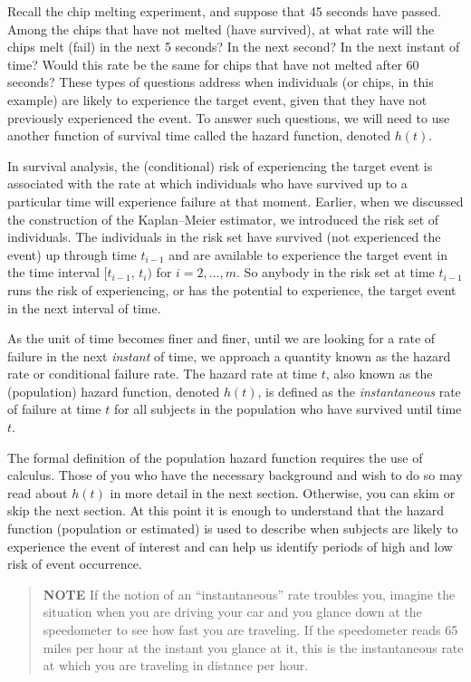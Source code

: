 \documentclass[
]{book}
\begin{document}
Recall the chip melting experiment, and suppose that 45 seconds have passed. Among the chips that have not melted (have survived), at what rate will the chips melt (fail) in the next 5 seconds? In the next second? In the next instant of time? Would this rate be the same for chips that have not melted after 60 seconds? These types of questions address when individuals (or chips, in this example) are likely to experience the target event, given that they have not previously experienced the event. To answer such questions, we will need to use another function of survival time called the hazard function, denoted \(h(t)\).

In survival analysis, the (conditional) risk of experiencing the target event is associated with the rate at which individuals who have survived up to a particular time will experience failure at that moment. Earlier, when we discussed the construction of the Kaplan--Meier estimator, we introduced the risk set of individuals. The individuals in the risk set have survived (not experienced the event) up through time \(t_{i-1}\) and are available to experience the target event in the time interval \([t_{i-1},\,t_i)\) for \(i = 2, \dots, m\). So anybody in the risk set at time \(t_{i-1}\) runs the risk of experiencing, or has the potential to experience, the target event in the next interval of time.

As the unit of time becomes finer and finer, until we are looking for a rate of failure in the next \emph{instant} of time, we approach a quantity known as the hazard rate or conditional failure rate. The hazard rate at time \(t\), also known as the (population) hazard function, denoted \(h(t)\), is defined as the \emph{instantaneous} rate of failure at time \(t\) for all subjects in the population who have survived until time \(t\).

The formal definition of the population hazard function requires the use of calculus. Those of you who have the necessary background and wish to do so may read about \(h(t)\) in more detail in the next section. Otherwise, you can skim or skip the next section. At this point it is enough to understand that the hazard function (population or estimated) is used to describe when subjects are likely to experience the event of interest and can help us identify periods of high and low risk of event occurrence.

\begin{quote}
\textbf{NOTE}
If the notion of an ``instantaneous'' rate troubles you, imagine the situation when you are driving your car and you glance down at the speedometer to see how fast you are traveling. If the speedometer reads 65 miles per hour at the instant you glance at it, this is the instantaneous rate at which you are traveling in distance per hour.
\end{quote}
\end{document}
